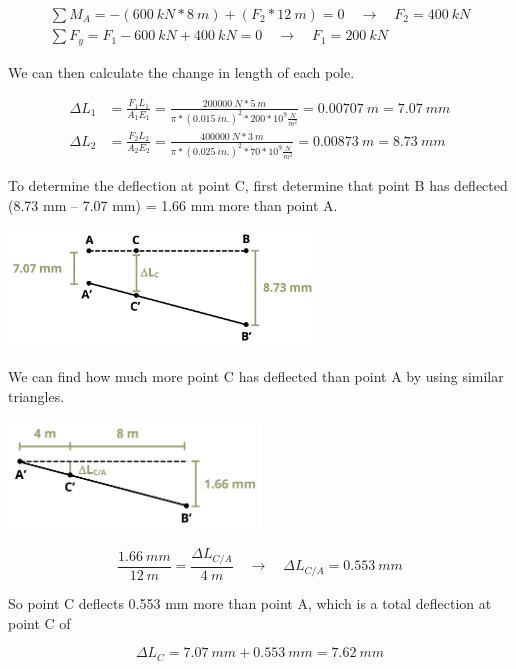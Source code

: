 \documentclass[
  letterpaper,
  DIV=11,
  numbers=noendperiod]{scrreprt}
\theoremstyle{definition}
\theoremstyle{remark}
\begin{document}
\begin{tcolorbox}
\begin{tcolorbox}
\[
\begin{gathered}
\sum M_A=-(600{~kN}* 8{~m})+(F_2 * 12{~m})=0 \quad\rightarrow\quad F_2=400{~kN} \\
\sum F_y=F_1-600{~kN}+400{~kN}=0 \quad\rightarrow\quad F_1=200{~kN}
\end{gathered}
\]

We can then calculate the change in length of each pole.

\[
\begin{aligned}
\Delta L_1 & =\frac{F_1 L_1}{A_1 E_1}=\frac{200000{~N} * 5{~m}}{\pi * (0.015{~in.})^2 * 200 * 10^9\frac{N}{m^2}}=0.00707{~m}=7.07{~mm} \\
\Delta L_2 & =\frac{F_2 L_2}{A_2 E_2}=\frac{400000{~N} * 3{~m}}{\pi * (0.025{~in.})^2 * 70 * 10^9\frac{N}{m^2}}=0.00873{~m}=8.73{~mm}
\end{aligned}
\]

To determine the deflection at point C, first determine that point B has
deflected (8.73 mm -- 7.07 mm) = 1.66 mm more than point A.

\begin{center}
\includegraphics[width=3.23958in,height=\textheight]{images/PNGs/Example 5.4 part 3.png}
\end{center}

We can find how much more point C has deflected than point A by using
similar triangles.

\begin{center}
\includegraphics[width=2.63542in,height=\textheight]{images/PNGs/Example 5.4 part 4.png}
\end{center}

\[
\frac{1.66{~mm}}{12{~m}}=\frac{\Delta L_{C / A}}{4{~m}} \quad\rightarrow\quad \Delta L_{C / A}=0.553{~mm}
\]

So point C deflects 0.553 mm more than point A, which is a total
deflection at point C of

\[
\Delta L_C=7.07{~mm}+0.553{~mm}=7.62{~mm}
\]

\end{tcolorbox}

\end{tcolorbox}
\end{document}
